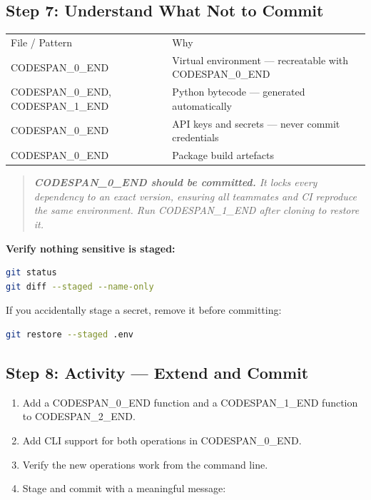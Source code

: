 \documentclass[11pt,a4paper]{book}
\begin{document}
\medskip

\subsection{Step 7: Understand What Not to Commit}

\begin{tabular}{ll}
\hline
File / Pattern & Why \\
CODESPAN\_0\_END & Virtual environment --- recreatable with CODESPAN\_0\_END \\
CODESPAN\_0\_END, CODESPAN\_1\_END & Python bytecode --- generated automatically \\
CODESPAN\_0\_END & API keys and secrets --- never commit credentials \\
CODESPAN\_0\_END & Package build artefacts \\
\hline
\end{tabular}

\begin{quote}
\textit{\textbf{CODESPAN\_0\_END should be committed.} It locks every dependency to an exact version, ensuring all teammates and CI reproduce the same environment. Run CODESPAN\_1\_END after cloning to restore it.}
\end{quote}

\textbf{Verify nothing sensitive is staged:}

\begin{lstlisting}[language=Bash]
git status
git diff --staged --name-only
\end{lstlisting}

If you accidentally stage a secret, remove it before committing:

\begin{lstlisting}[language=Bash]
git restore --staged .env
\end{lstlisting}

\medskip

\subsection{Step 8: Activity --- Extend and Commit}

\begin{enumerate}
  \item Add a CODESPAN\_0\_END function and a CODESPAN\_1\_END function to CODESPAN\_2\_END.
  \item Add CLI support for both operations in CODESPAN\_0\_END.
  \item Verify the new operations work from the command line.
  \item Stage and commit with a meaningful message:
\end{enumerate}
\end{document}
